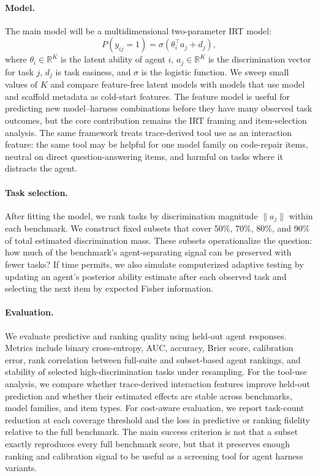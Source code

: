\documentclass{article}
\begin{document}
\paragraph{Model.}
The main model will be a multidimensional two-parameter IRT model:
\[
  P(y_{ij}=1) = \sigma(\theta_i^\top a_j + d_j),
\]
where $\theta_i \in \mathbb{R}^K$ is the latent ability of agent $i$, $a_j \in \mathbb{R}^K$ is the discrimination vector for task $j$, $d_j$ is task easiness, and $\sigma$ is the logistic function. We sweep small values of $K$ and compare feature-free latent models with models that use model and scaffold metadata as cold-start features. The feature model is useful for predicting new model--harness combinations before they have many observed task outcomes, but the core contribution remains the IRT framing and item-selection analysis. The same framework treats trace-derived tool use as an interaction feature: the same tool may be helpful for one model family on code-repair items, neutral on direct question-answering items, and harmful on tasks where it distracts the agent.

\paragraph{Task selection.}
After fitting the model, we rank tasks by discrimination magnitude $\|a_j\|$ within each benchmark. We construct fixed subsets that cover 50\%, 70\%, 80\%, and 90\% of total estimated discrimination mass. These subsets operationalize the question: how much of the benchmark's agent-separating signal can be preserved with fewer tasks? If time permits, we also simulate computerized adaptive testing by updating an agent's posterior ability estimate after each observed task and selecting the next item by expected Fisher information.

\paragraph{Evaluation.}
We evaluate predictive and ranking quality using held-out agent responses. Metrics include binary cross-entropy, AUC, accuracy, Brier score, calibration error, rank correlation between full-suite and subset-based agent rankings, and stability of selected high-discrimination tasks under resampling. For the tool-use analysis, we compare whether trace-derived interaction features improve held-out prediction and whether their estimated effects are stable across benchmarks, model families, and item types. For cost-aware evaluation, we report task-count reduction at each coverage threshold and the loss in predictive or ranking fidelity relative to the full benchmark. The main success criterion is not that a subset exactly reproduces every full benchmark score, but that it preserves enough ranking and calibration signal to be useful as a screening tool for agent harness variants.
\end{document}
